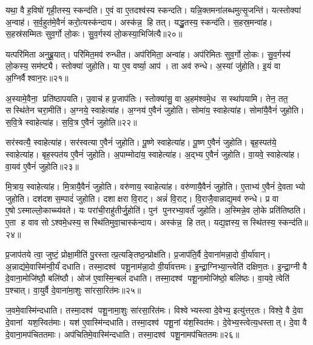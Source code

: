 यथा॒ वै ह॒विषो॑ गृही॒तस्य॒ स्कन्द॑ति।
ए॒वं वा ए॒तदश्व॑स्य स्कन्दति।
यन्नि॒क्तमना॑लब्धमुत्सृ॒जन्ति॑।
यत्स्तोक्या॑ अ॒न्वाह॑।
स॒र्व॒हुत॑मे॒वैनं॑ करो॒त्यस्क॑न्दाय।
अस्क॑न्न॒ हि तत्।
यद्धु॒तस्य॒ स्कन्द॑ति।
स॒हस्र॒मन्वा॑ह।
स॒हस्र॑सम्मितः सुव॒र्गो लो॒कः।
सु॒व॒र्गस्य॑ लो॒कस्या॒भिजि॑त्यै॥२०॥

यत्परि॑मिता अनुब्रू॒यात्।
परि॑मित॒मव॑ रुन्धीत।
अप॑रिमिता॒ अन्वा॑ह।
अप॑रिमितः सुव॒र्गो लो॒कः।
सु॒व॒र्गस्य॑ लो॒कस्य॒ सम॑ष्ट्यै।
स्तोक्या॑ जुहोति।
या ए॒व वर्ष्या॒ आप॑।
ता अव॑ रुन्धे।
अ॒स्यां जु॑होति।
इ॒यं वा अ॒ग्निर्वैश्वान॒रः॥२१॥

अ॒स्यामे॒वैना॒ प्रति॑ष्ठापयति।
उ॒वाच॑ ह प्र॒जाप॑तिः।
स्तोक्या॑सु॒ वा अ॒हम॑श्वमे॒ध सस्था॑पयामि।
तेन॒ तत॒ सस्थि॑तेन चरा॒मीति॑।
अ॒ग्नये॒ स्वाहेत्या॑ह।
अ॒ग्नय॑ ए॒वैनं॑ जुहोति।
सोमा॑य॒ स्वाहेत्या॑ह।
सोमा॑यै॒वैनं॑ जुहोति।
स॒वि॒त्रे स्वाहेत्या॑ह।
स॒वि॒त्र ए॒वैनं॑ जुहोति॥२२॥

सर॑स्वत्यै॒ स्वाहेत्या॑ह।
सर॑स्वत्या ए॒वैनं॑ जुहोति।
पू॒ष्णे स्वाहेत्या॑ह।
पू॒ष्ण ए॒वैनं॑ जुहोति।
बृह॒स्पत॑ये॒ स्वाहेत्या॑ह।
बृह॒स्पत॑य ए॒वैनं॑ जुहोति।
अ॒पाम्मोदा॑य॒ स्वाहेत्या॑ह।
अ॒द्भ्य ए॒वैनं॑ जुहोति।
वा॒यवे॒ स्वाहेत्या॑ह।
वा॒यव॑ ए॒वैनं॑ जुहोति॥२३॥

मि॒त्राय॒ स्वाहेत्या॑ह।
मि॒त्रायै॒वैनं॑ जुहोति।
वरु॑णाय॒ स्वाहेत्या॑ह।
वरु॑णायै॒वैनं॑ जुहोति।
ए॒ताभ्य॑ ए॒वैनं॑ दे॒वताभ्यो जुहोति।
दश॑दश स॒म्पादं॑ जुहोति।
दशाक्षरा वि॒राट्।
अन्नं॑ वि॒राट्।
वि॒राजै॒वान्नाद्य॒मव॑ रुन्धे।
प्र वा ए॒षोऽस्माल्लो॒काच्च्य॑वते।
यः परा॑ची॒राहु॑तीर्जु॒होति॑।
पुन॑ पुनरभ्या॒वर्तं॑ जुहोति।
अ॒स्मिन्ने॒व लो॒के प्रति॑तिष्ठति।
ए॒ता ह वाव सोऽश्वमे॒धस्य॒ सस्थि॑तिमुवा॒चास्क॑न्दाय।
अस्क॑न्न॒ हि तत्।
यद्य॒ज्ञस्य॒ सस्थि॑तस्य॒ स्कन्द॑ति॥२४॥\anuvakamend[अ॒भिजि॑त्यै वैश्वान॒रः स॑वि॒त्र ए॒वैनं॑ जुहोति वा॒यव॑ ए॒वैनं॑ जुहोति च्यवते॒ षट् च॑]

प्र॒जाप॑तये त्वा॒ जुष्टं॒ प्रोक्षा॒मीति॑ पु॒रस्तात्प्र॒त्यङ्तिष्ठ॒न्प्रोक्ष॑ति।
प्र॒जाप॑ति॒र्वै दे॒वाना॑मन्ना॒दो वी॒र्या॑वान्।
अ॒न्नाद्य॑मे॒वास्मि॑न्वी॒र्यं॑ दधाति।
तस्मा॒दश्व॑ पशू॒नाम॑न्ना॒दो वी॒र्या॑वत्तमः।
इ॒न्द्रा॒ग्निभ्या॒न्त्वेति॑ दक्षिण॒तः।
इ॒न्द्रा॒ग्नी वै दे॒वाना॒मोजि॑ष्ठौ॒ बलि॑ष्ठौ।
ओज॑ ए॒वास्मि॒न्बलं॑ दधाति।
तस्मा॒दश्व॑ पशू॒नामोजि॑ष्ठो॒ बलि॑ष्ठः।
वा॒यवे॒ त्वेति॑ प॒श्चात्।
वा॒युर्वै दे॒वाना॑मा॒शुः सा॑रसा॒रित॑मः॥२५॥

ज॒वमे॒वास्मि॑न्दधाति।
तस्मा॒दश्व॑ पशू॒नामा॒शुः सा॑रसा॒रित॑मः।
विश्वेभ्यस्त्वा दे॒वेभ्य॒ इत्यु॑त्तर॒तः।
विश्वे॒ वै दे॒वा दे॒वानां यश॒स्वित॑माः।
यश॑ ए॒वास्मि॑न्दधाति।
तस्मा॒दश्व॑ पशू॒नां य॑श॒स्वित॑मः।
दे॒वेभ्य॒स्त्वेत्य॒धस्तात्।
दे॒वा वै दे॒वाना॒मप॑चिततमाः।
अप॑चितिमे॒वास्मि॑न्दधाति।
तस्मा॒दश्व॑ पशू॒नामप॑चिततमः॥२६॥

